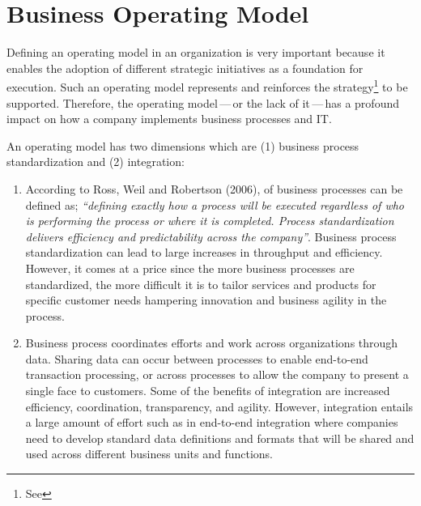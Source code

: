 \chapter{Business Operating Model}
\label{ch:operating-model}


Defining an operating model in an organization is very important because it enables the
adoption of different strategic initiatives as a foundation for execution.
Such an operating model represents and reinforces the
strategy\footnote{See } to be supported.
Therefore, the operating model\,---\,or the lack of it\,---\,has a profound impact on how a company
implements business processes and IT.

An operating model has two dimensions which are (1) business process standardization and (2) integration:

\begin{enumerate}
    \item According to Ross, Weil and Robertson (2006),  of business processes can be defined as;
          \textit{“defining exactly how a process will be executed regardless of who is performing the process or
          where it is completed.
          Process standardization delivers efficiency and predictability across the company”}.
          Business process standardization can lead to large increases in throughput and efficiency.
          However, it comes at a price since the more business processes are standardized,
          the more difficult it is to tailor services and products for specific customer needs hampering
          innovation and business agility in the process.
    \item Business process  coordinates efforts and work across organizations through data.
          Sharing data can occur between processes to enable end-to-end transaction processing,
          or across processes to allow the company to present a single face to customers.
          Some of the benefits of integration are increased efficiency, coordination, transparency, and agility.
          However, integration entails a large amount of effort such as in end-to-end integration where companies
          need to develop standard data definitions and formats that will be shared and used across different
          business units and functions.
\end{enumerate}

